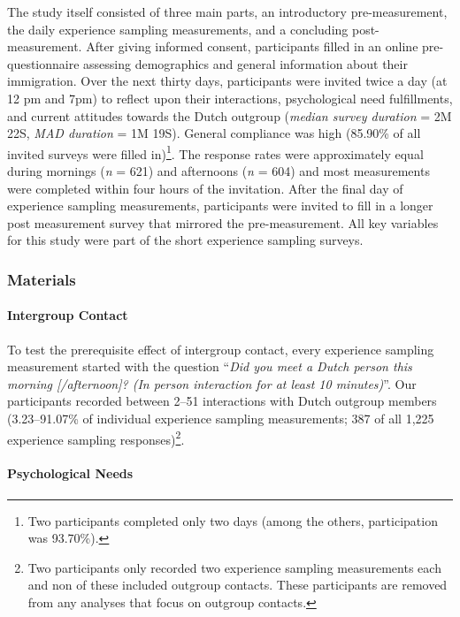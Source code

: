 The study itself consisted of three main parts, an introductory
pre-measurement, the daily experience sampling measurements, and a
concluding post-measurement. After giving informed consent, participants
filled in an online pre-questionnaire assessing demographics and general
information about their immigration. Over the next thirty days,
participants were invited twice a day (at 12 pm and 7pm) to reflect upon
their interactions, psychological need fulfillments, and current
attitudes towards the Dutch outgroup (\textit{median survey duration} =
2M 22S, \textit{MAD duration} = 1M 19S). General compliance was high
(85.90\% of all invited surveys were filled
in)\footnote{Two participants completed only two days (among the others, participation was 93.70\%).}.
The response rates were approximately equal during mornings (\textit{n}
= 621) and afternoons (\textit{n} = 604) and most measurements were
completed within four hours of the invitation. After the final day of
experience sampling measurements, participants were invited to fill in a
longer post measurement survey that mirrored the pre-measurement. All
key variables for this study were part of the short experience sampling
surveys.

\subsubsection{Materials}

\paragraph{Intergroup Contact}

To test the prerequisite effect of intergroup contact, every experience
sampling measurement started with the question
``\textit{Did you meet a Dutch person this morning [/afternoon]? (In person interaction for at least 10 minutes)}''.
Our participants recorded between 2--51 interactions with Dutch outgroup
members (3.23--91.07\% of individual experience sampling measurements;
387 of all 1,225 experience sampling
responses)\footnote{Two participants only recorded two experience sampling measurements each and non of these included outgroup contacts. These participants are removed from any analyses that focus on outgroup contacts.}.

\paragraph{Psychological Needs}

